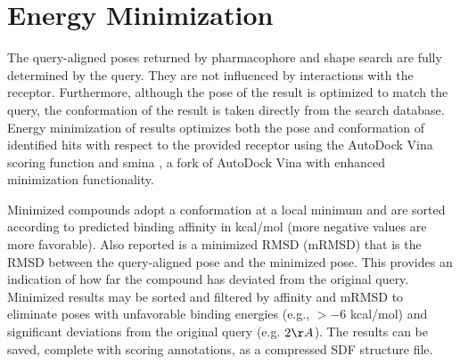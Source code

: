 \section{Energy Minimization}

The query-aligned poses returned by pharmacophore and shape search are fully determined by the query. They are not influenced by interactions with the receptor.  Furthermore, although the pose of the result is optimized to match the query, the conformation of the result is taken directly from the search database.  Energy minimization of results optimizes both the pose and conformation of identified hits with respect to the provided receptor using the AutoDock Vina \cite{Trott_2009} scoring function and smina \cite{smina}, a fork of AutoDock Vina with enhanced minimization functionality. 

Minimized compounds adopt a conformation at a local minimum and are sorted according to predicted binding affinity in kcal/mol (more negative values are more favorable).  Also reported is a minimized RMSD (mRMSD) that is the RMSD between the query-aligned pose and the minimized pose.  This provides an indication of how far the compound has deviated from the original query.  Minimized results may be sorted and filtered by affinity and mRMSD to eliminate poses with unfavorable binding energies (e.g., $>-6$ kcal/mol) and significant deviations from the original query (e.g. $2\AA$). The results can be saved, complete with scoring annotations, as a compressed SDF structure file.